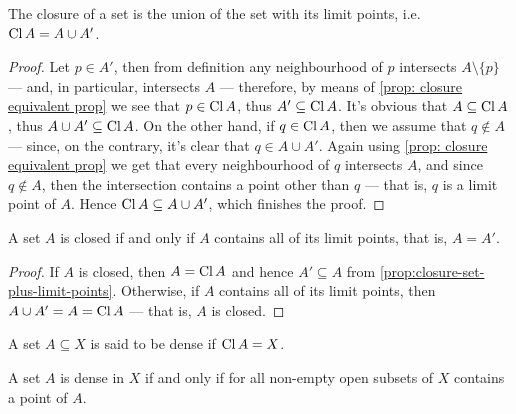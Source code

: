 \begin{proposition}
    \label{prop:closure-set-plus-limit-points}
    The closure of a set is the union of the set with its limit points,
    i.e. \(\operatorname{Cl} A = A \cup A'\).
\end{proposition}

\begin{proof}
    Let \(p \in A'\), then from definition any neighbourhood of \(p\) intersects
    \(A \setminus \{p\}\) --- and, in particular, intersects \(A\) --- therefore, by
    means of \cref{prop: closure equivalent prop} we see that \(p \in
    \operatorname{Cl} A\), thus \(A' \subseteq \operatorname{Cl} A\). It's obvious that \(A
    \subseteq \operatorname{Cl} A\), thus \(A \cup A' \subseteq \operatorname{Cl} A\). On the
    other hand, if \(q \in \operatorname{Cl} A\), then we assume that \(q \notin A\) ---
    since, on the contrary, it's clear that \(q \in A \cup A'\). Again using
    \cref{prop: closure equivalent prop} we get that every neighbourhood of \(q\)
    intersects \(A\), and since \(q \notin A\), then the intersection contains a
    point other than \(q\) --- that is, \(q\) is a limit point of \(A\). Hence
    \(\operatorname{Cl} A \subseteq A \cup A'\), which finishes the proof.
\end{proof}

\begin{corollary}
    \label{cor:closed-limit-points}
    A set \(A\) is closed if and only if \(A\) contains all of its limit points,
    that is, \(A = A'\).
\end{corollary}

\begin{proof}
    If \(A\) is closed, then \(A = \operatorname{Cl} A\) and hence \(A' \subseteq A\) from
    \cref{prop:closure-set-plus-limit-points}. Otherwise, if \(A\) contains all of
    its limit points, then \(A \cup A' = A = \operatorname{Cl} A\) --- that is, \(A\) is
    closed.
\end{proof}

\begin{definition}
    \label{def:dense-set}
    A set \(A \subseteq X\) is said to be dense if \(\operatorname{Cl} A = X\).
\end{definition}

\begin{proposition}
    \label{prop:dense-non-empty-intersects}
    A set \(A\) is dense in \(X\) if and only if for all non-empty open subsets of
    \(X\) contains a point of \(A\).
\end{proposition}

